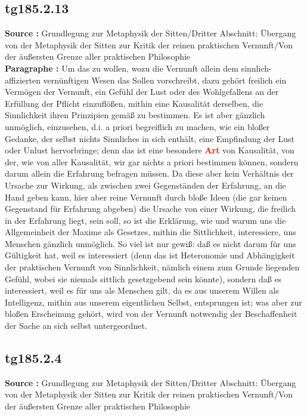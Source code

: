 \documentclass[a4paper,12pt,twoside]{book}
\newcommand{\match}[1]{\textcolor{red}{\textbf{#1}}}
\begin{document}
	\subsection*{tg185.2.13} 
	\textbf{Source : }Grundlegung zur Metaphysik der Sitten/Dritter Abschnitt: Übergang von der Metaphysik der Sitten zur Kritik der reinen praktischen Vernunft/Von der äußersten Grenze aller praktischen Philosophie\\  
	
	\noindent\textbf{Paragraphe : }Um das zu wollen, wozu die Vernunft allein dem sinnlich-affizierten vernünftigen Wesen das Sollen vorschreibt, dazu gehört freilich ein Vermögen der Vernunft, ein Gefühl der Lust oder des Wohlgefallens an der Erfüllung der Pflicht einzuflößen, mithin eine Kausalität derselben, die Sinnlichkeit ihren Prinzipien gemäß zu bestimmen. Es ist aber gänzlich unmöglich, einzusehen, d.i. a priori begreiflich zu machen, wie ein bloßer Gedanke, der selbst nichts Sinnliches in sich enthält, eine Empfindung der Lust oder Unlust hervorbringe; denn das ist eine besondere \match{Art} von Kausalität, von der, wie von aller Kausalität, wir gar nichts a priori bestimmen können, sondern darum allein die Erfahrung befragen müssen. Da diese aber kein Verhältnis der Ursache zur Wirkung, als zwischen zwei Gegenständen der Erfahrung, an die Hand geben kann, hier aber reine Vernunft durch bloße Ideen (die gar keinen Gegenstand für Erfahrung abgeben) die Ursache von einer Wirkung, die freilich in der Erfahrung liegt, sein soll, so ist die Erklärung, wie und warum uns die Allgemeinheit der Maxime als Gesetzes, mithin die Sittlichkeit, interessiere, uns Menschen gänzlich unmöglich. So viel ist nur gewiß: daß es nicht darum für uns Gültigkeit hat, weil es interessiert (denn das ist Heteronomie und Abhängigkeit der praktischen Vernunft von Sinnlichkeit, nämlich einem zum Grunde liegenden Gefühl, wobei sie niemals sittlich gesetzgebend sein könnte), sondern daß es interessiert, weil es für uns als Menschen gilt, da es aus unserem Willen als Intelligenz, mithin aus unserem eigentlichen Selbst, entsprungen ist; was aber zur bloßen Erscheinung gehört, wird von der Vernunft notwendig der Beschaffenheit der Sache an sich selbst untergeordnet.
	
	
	\subsection*{tg185.2.4} 
	\textbf{Source : }Grundlegung zur Metaphysik der Sitten/Dritter Abschnitt: Übergang von der Metaphysik der Sitten zur Kritik der reinen praktischen Vernunft/Von der äußersten Grenze aller praktischen Philosophie\\  
	
\end{document}
